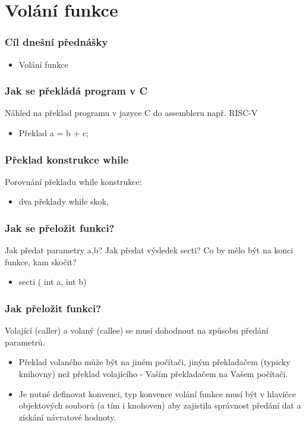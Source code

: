 \documentclass{beamer}
\subtitle{Lekce 10. Volání funkce}
\author{Pavel Píša \phantom{xxxxxxxxx} Petr Štěpán \\ \small\texttt{pisa@fel.cvut.cz}\phantom{xxxx}\small\texttt{stepan@fel.cvut.cz}}
\begin{document}
\maketitle

\section{Volání funkce}

\begin{frame}
\frametitle{Cíl dnešní přednášky}

\begin{itemize}
 \item Volání funkce
\end{itemize}
\end{frame}


\begin{frame}
\frametitle{Jak se překládá program v C}

Náhled na překlad programu v jazyce C do assembleru např. RISC-V
\begin{itemize}
 \item Překlad a = b + c;
\end{itemize}
\end{frame}


\begin{frame}
\frametitle{Překlad konstrukce while}

Porovnání překladu while konstrukce:
\begin{itemize}
 \item dva překlady while skok, 
\end{itemize}
\end{frame}


\begin{frame}
\frametitle{Jak se přeložit funkci?}

Jak předat parametry a,b?
Jak předat výsledek secti?
Co by mělo být na konci funkce, kam skočit?
\begin{itemize}
 \item secti ( int a, int b)
\end{itemize}
\end{frame}


\begin{frame}
\frametitle{Jak přeložit funkci?}

Volající (caller) a volaný (callee) se musí dohodnout na způsobu předání parametrů.
\begin{itemize}
 \item Překlad volaného může být na jiném počítači, jiným překladačem (typicky knihovny) než překlad volajícího - Vaším překladačem na Vašem počítači.
 \item Je nutné definovat konvenci, typ konvence volání funkce musí být v hlavičce objektových souborů (a tím i knohoven) aby zajistila správnost předání dat a získání návratové hodnoty.
\end{itemize}
\end{frame}
\end{document}
